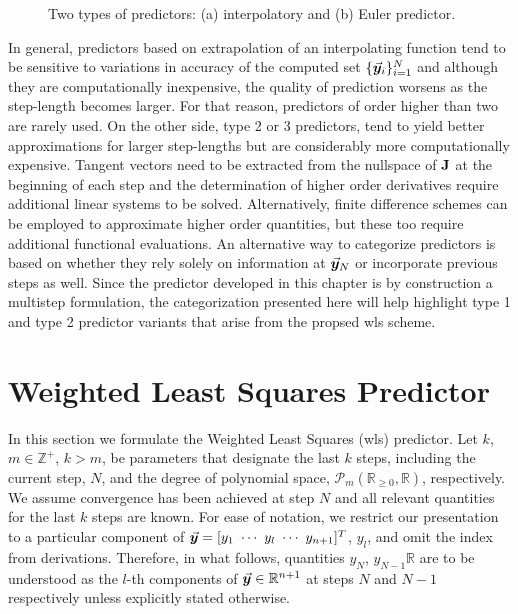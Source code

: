 \begin{figure*}[t]
	\centering
	\qquad
	\caption{Two types of predictors: (a) interpolatory and (b) Euler
		predictor.}%
	\label{fig:FIG42}%
\end{figure*}

In general, predictors based on extrapolation of an
interpolating function tend to be sensitive to variations in accuracy of the 
computed set
$\{\vec{\bm{y}}_i\}_{i=1}^N$ and although they are computationally inexpensive, the 
quality of prediction worsens as the 
step-length becomes
larger. For that reason, predictors of order higher than two are rarely
used\cite{Seydel87,Salgovic81}. On the other side, type 2 or 3
predictors\cite{Schwetlick87,Gervais04,Syam02,Syam03,Watson87,Deuflhard87,Lundberg93},
 tend to yield better approximations for larger step-lengths but are 
considerably more computationally expensive. Tangent vectors need to be
extracted from the nullspace of $\mathbf{J}$ at the beginning of each step and
the determination of higher order derivatives require additional linear systems
to be solved. Alternatively, finite difference schemes can be employed to
approximate higher order quantities, but these too require additional functional
evaluations. An alternative way to categorize predictors is based on whether
they rely solely on information at $\vec{\bm{y}}_N$ or incorporate previous steps as
well\cite{Allgower91}. Since the predictor developed in this chapter is by 
construction a multistep formulation, the categorization
presented here will help highlight type 1 and type 2 predictor variants that
arise from the propsed \acrshort{wls} scheme.



\section{Weighted Least Squares Predictor}\label{CH5-S2}

In this section we formulate the Weighted Least Squares (\acrshort{wls}) 
predictor. Let $k$, $m\in\mathbb{Z}^+$, $k>m$, be parameters that designate the 
last $k$ 
steps, including the current step, $N$, and the degree of polynomial space,
$\mathcal{P}_m(\mathbb{R}_{\geq0},\mathbb{R})$,
respectively.
We assume convergence has been achieved at step $N$ and all
relevant quantities for the last $k$ steps are known. 
 For ease of notation, we restrict our presentation to a particular
component of $\bvec{y}=[ y_1\ \cdots\ y_l\ \cdots\  y_{n+1}]^T$, $y_l$, and 
omit 
the index from derivations.  Therefore, in what follows, quantities
$y_N$, $y_{N-1}\mathbb{R}$
are to be understood as the $l$-th components of $\vec{\bm{y}}\in\mathbb{R}^{n+1}$ 
at steps $N$ and $N-1$ respectively unless explicitly stated otherwise. 

